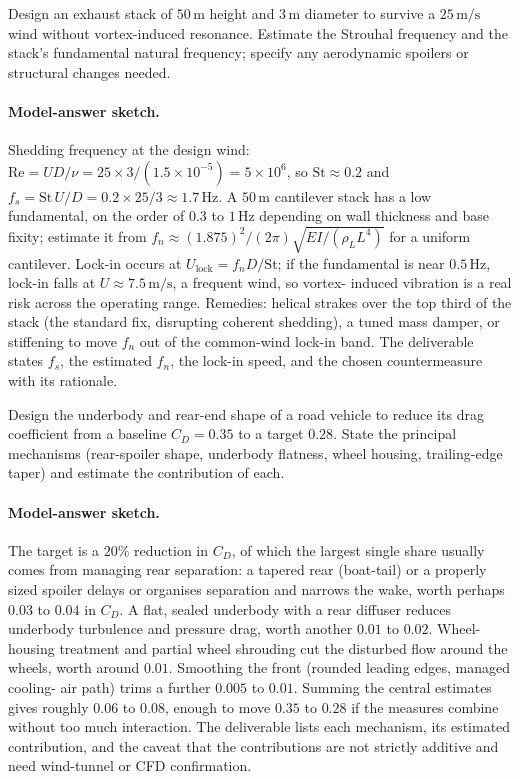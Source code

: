 \begin{exercise}
Design an exhaust stack of $50\,\si{\meter}$ height and $3\,\si{
\meter}$ diameter to survive a $25\,\si{\meter\per\second}$ wind
without vortex-induced resonance. Estimate the Strouhal frequency
and the stack's fundamental natural frequency; specify any
aerodynamic spoilers or structural changes needed.

\paragraph{Model-answer sketch.} Shedding frequency at the design
wind: $\text{Re} = UD/\nu = 25\times3/(1.5\times10^{-5}) =
5\times10^{6}$, so $\text{St}\approx0.2$ and $f_s = \text{St}\,U/D =
0.2\times25/3\approx1.7\,\si{\hertz}$. A $50\,\si{\meter}$ cantilever
stack has a low fundamental, on the order of $0.3$ to $1\,\si{\hertz}$
depending on wall thickness and base fixity; estimate it from
$f_n\approx(1.875)^2/(2\pi)\sqrt{EI/(\rho_L L^4)}$ for a uniform
cantilever. Lock-in occurs at $U_{\text{lock}} = f_n D/\text{St}$; if
the fundamental is near $0.5\,\si{\hertz}$, lock-in falls at $U
\approx7.5\,\si{\meter\per\second}$, a frequent wind, so vortex-
induced vibration is a real risk across the operating range. Remedies:
helical strakes over the top third of the stack (the standard fix,
disrupting coherent shedding), a tuned mass damper, or stiffening to
move $f_n$ out of the common-wind lock-in band. The deliverable
states $f_s$, the estimated $f_n$, the lock-in speed, and the chosen
countermeasure with its rationale.
\end{exercise}

\begin{exercise}
Design the underbody and rear-end shape of a road vehicle to
reduce its drag coefficient from a baseline $C_D = 0.35$ to a
target $0.28$. State the principal mechanisms (rear-spoiler shape,
underbody flatness, wheel housing, trailing-edge taper) and
estimate the contribution of each.

\paragraph{Model-answer sketch.} The target is a $20\%$ reduction in
$C_D$, of which the largest single share usually comes from managing
rear separation: a tapered rear (boat-tail) or a properly sized
spoiler delays or organises separation and narrows the wake, worth
perhaps $0.03$ to $0.04$ in $C_D$. A flat, sealed underbody with a
rear diffuser reduces underbody turbulence and pressure drag, worth
another $0.01$ to $0.02$. Wheel-housing treatment and partial wheel
shrouding cut the disturbed flow around the wheels, worth around
$0.01$. Smoothing the front (rounded leading edges, managed cooling-
air path) trims a further $0.005$ to $0.01$. Summing the central
estimates gives roughly $0.06$ to $0.08$, enough to move $0.35$ to
$0.28$ if the measures combine without too much interaction. The
deliverable lists each mechanism, its estimated contribution, and the
caveat that the contributions are not strictly additive and need
wind-tunnel or CFD confirmation.
\end{exercise}

